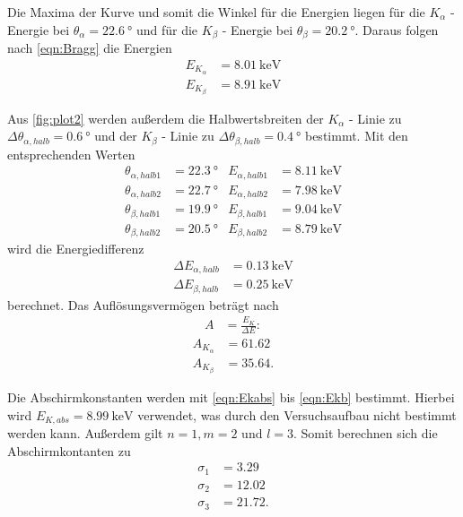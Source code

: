 Die Maxima der Kurve und somit die Winkel für die Energien liegen für die 
$K_\alpha$ -Energie  bei $\theta_\alpha=\qty{22.6}{\degree}$ und für die $K_\beta$ - Energie
bei $\theta_\beta=\qty{20.2}{\degree}$.
Daraus folgen nach \autoref{eqn:Bragg} die Energien
\begin{align*}
  E_{K_\alpha}&= \qty{8.01}{\kilo\electronvolt}\\
  E_{K_\beta}&= \qty{8.91}{\kilo\electronvolt}
\end{align*} 


Aus \autoref{fig:plot2} werden außerdem die Halbwertsbreiten der $K_\alpha$ - Linie zu $\Delta\theta_{\alpha,halb}=\qty{0.6}{\degree}$ und
der $K_\beta$ - Linie zu $\Delta\theta_{\beta,halb}=\qty{0.4}{\degree}$ bestimmt.
Mit den entsprechenden Werten  
\begin{align*}
  \theta_{\alpha,halb1}&=\qty{22.3}{\degree}  & E_{\alpha,halb1}&= \qty{8.11}{\kilo\electronvolt}\\
  \theta_{\alpha,halb2}&=\qty{22.7}{\degree}  & E_{\alpha,halb2}&= \qty{7.98}{\kilo\electronvolt}\\
  \theta_{\beta,halb1}&=\qty{19.9}{\degree}    & E_{\beta,halb1}&= \qty{9.04}{\kilo\electronvolt}\\
  \theta_{\beta,halb2}&=\qty{20.5}{\degree}  & E_{\beta,halb2}&= \qty{8.79}{\kilo\electronvolt}
 \end{align*}
wird die Energiedifferenz
\begin{align*}
 \Delta E_{\alpha,halb}&= \qty{0.13}{\kilo\electronvolt}\\
 \Delta E_{\beta,halb}&= \qty{0.25}{\kilo\electronvolt}
\end{align*}
berechnet.
Das Auflösungsvermögen beträgt nach 
\begin{align*}
  A &= \frac{E_K}{\Delta E}:
\end{align*}
\begin{align*}
  A_{K_\alpha} &= 61.62\\
  A_{K_\beta} &= 35.64.
\end{align*}


Die Abschirmkonstanten werden mit \autoref{eqn:Ekabs} bis \autoref{eqn:Ekb} bestimmt. Hierbei wird
$E_{K,abs}= \qty{8.99}{\kilo\electronvolt}$\cite{X-Ray} verwendet, was durch den Versuchsaufbau nicht bestimmt werden kann.
Außerdem gilt $n=1, m=2$ und $l=3$.
Somit berechnen sich die Abschirmkontanten zu
\begin{align*}
  \sigma_1 &= 3.29\\
  \sigma_2 &= 12.02\\
  \sigma_3 &= 21.72.
\end{align*}

